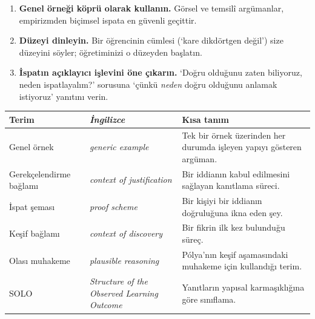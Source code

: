 
\begin{enumerate}[leftmargin=1.6em,label=\textbf{\arabic*.}]
\item \textbf{Genel örneği köprü olarak kullanın.} Görsel ve temsilî argümanlar, empirizmden biçimsel ispata en güvenli geçittir.
\item \textbf{Düzeyi dinleyin.} Bir öğrencinin cümlesi (‘kare dikdörtgen değil’) size düzeyini söyler; öğretiminizi o düzeyden başlatın.
\item \textbf{İspatın açıklayıcı işlevini öne çıkarın.} ‘Doğru olduğunu zaten biliyoruz, neden ispatlayalım?’ sorusuna ‘çünkü \emph{neden} doğru olduğunu anlamak istiyoruz’ yanıtını verin.
\end{enumerate}


{\small
\renewcommand{\arraystretch}{1.25}
\begin{longtable}{>{\raggedright\arraybackslash}p{2.3cm}>{\raggedright\itshape\arraybackslash}p{2.3cm}>{\raggedright\arraybackslash}p{5.6cm}}
\toprule
\textbf{Terim} & \textbf{\upshape İngilizce} & \textbf{Kısa tanım}\\
\midrule\endhead
Genel örnek & generic example & Tek bir örnek üzerinden her durumda işleyen yapıyı gösteren argüman.\\
Gerekçelendirme bağlamı & context of justification & Bir iddianın kabul edilmesini sağlayan kanıtlama süreci.\\
İspat şeması & proof scheme & Bir kişiyi bir iddianın doğruluğuna ikna eden şey.\\
Keşif bağlamı & context of discovery & Bir fikrin ilk kez bulunduğu süreç.\\
Olası muhakeme & plausible reasoning & Pólya’nın keşif aşamasındaki muhakeme için kullandığı terim.\\
SOLO & Structure of the Observed Learning Outcome & Yanıtların yapısal karmaşıklığına göre sınıflama.\\
\bottomrule
\end{longtable}
}
